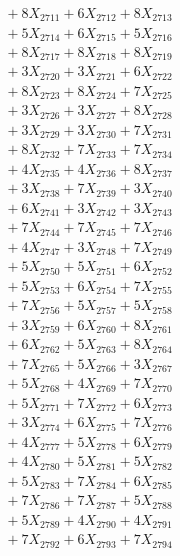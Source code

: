 \documentclass[a4paper,10pt]{article}
\begin{document}
{\begin{align}
&\;  + 8 X_{2711} + 6 X_{2712} + 8 X_{2713} \\[0.3ex]
&\;  + 5 X_{2714} + 6 X_{2715} + 5 X_{2716} \\[0.3ex]
&\;  + 8 X_{2717} + 8 X_{2718} + 8 X_{2719} \\[0.3ex]
&\;  + 3 X_{2720} + 3 X_{2721} + 6 X_{2722} \\[0.3ex]
&\;  + 8 X_{2723} + 8 X_{2724} + 7 X_{2725} \\[0.3ex]
&\;  + 3 X_{2726} + 3 X_{2727} + 8 X_{2728} \\[0.3ex]
&\;  + 3 X_{2729} + 3 X_{2730} + 7 X_{2731} \\[0.3ex]
&\;  + 8 X_{2732} + 7 X_{2733} + 7 X_{2734} \\[0.3ex]
&\;  + 4 X_{2735} + 4 X_{2736} + 8 X_{2737} \\[0.3ex]
&\;  + 3 X_{2738} + 7 X_{2739} + 3 X_{2740} \\[0.5ex]\allowbreak
&\;  + 6 X_{2741} + 3 X_{2742} + 3 X_{2743} \\[0.3ex]
&\;  + 7 X_{2744} + 7 X_{2745} + 7 X_{2746} \\[0.3ex]
&\;  + 4 X_{2747} + 3 X_{2748} + 7 X_{2749} \\[0.3ex]
&\;  + 5 X_{2750} + 5 X_{2751} + 6 X_{2752} \\[0.3ex]
&\;  + 5 X_{2753} + 6 X_{2754} + 7 X_{2755} \\[0.3ex]
&\;  + 7 X_{2756} + 5 X_{2757} + 5 X_{2758} \\[0.3ex]
&\;  + 3 X_{2759} + 6 X_{2760} + 8 X_{2761} \\[0.3ex]
&\;  + 6 X_{2762} + 5 X_{2763} + 8 X_{2764} \\[0.3ex]
&\;  + 7 X_{2765} + 5 X_{2766} + 3 X_{2767} \\[0.3ex]
&\;  + 5 X_{2768} + 4 X_{2769} + 7 X_{2770} \\[0.5ex]\allowbreak
&\;  + 5 X_{2771} + 7 X_{2772} + 6 X_{2773} \\[0.3ex]
&\;  + 3 X_{2774} + 6 X_{2775} + 7 X_{2776} \\[0.3ex]
&\;  + 4 X_{2777} + 5 X_{2778} + 6 X_{2779} \\[0.3ex]
&\;  + 4 X_{2780} + 5 X_{2781} + 5 X_{2782} \\[0.3ex]
&\;  + 5 X_{2783} + 7 X_{2784} + 6 X_{2785} \\[0.3ex]
&\;  + 7 X_{2786} + 7 X_{2787} + 5 X_{2788} \\[0.3ex]
&\;  + 5 X_{2789} + 4 X_{2790} + 4 X_{2791} \\[0.3ex]
&\;  + 7 X_{2792} + 6 X_{2793} + 7 X_{2794} \\[0.3ex]

\end{align}}
\end{document}
